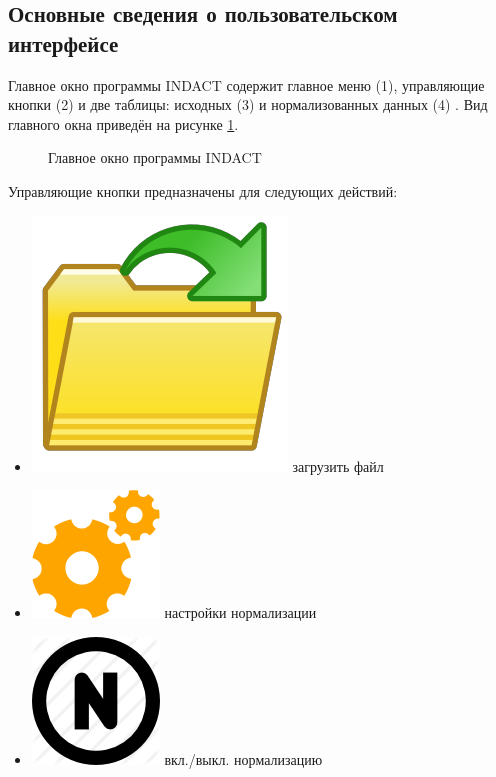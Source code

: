\documentclass[12pt]{diploma}
\begin{document}
	\subsection{Основные сведения о пользовательском интерфейсе}
	
	Главное окно программы INDACT содержит главное меню (1), управляющие кнопки (2) и две таблицы: исходных (3) и нормализованных данных (4) . Вид главного окна приведён на рисунке \ref{fig:main-gui}.

	\begin{figure}[h!]
		\centering
						
		\caption{Главное окно программы INDACT}
		\label{fig:main-gui}
	\end{figure}
	
	Управляющие кнопки предназначены для следующих действий:
	\begin{itemize}
		\item \includegraphics[scale=0.05]{img/folder-ico} загрузить файл
		\item \includegraphics[scale=0.1]{img/settings} настройки нормализации
		\item \includegraphics[scale=0.05]{img/norm} вкл./выкл. нормализацию

\end{itemize}
\end{document}
